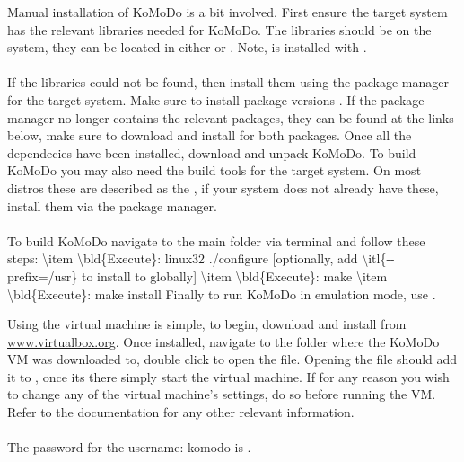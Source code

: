 Manual installation of KoMoDo is a bit involved. First ensure the target system has the relevant libraries needed for KoMoDo. The libraries
should be on the system, they can be located in either  or . Note,  is installed with .\\\\
%
If the libraries could not be found, then install them using the package manager for the target system. Make sure to install package versions . If the package manager no longer contains the relevant packages, they can be found at the links below, make sure to download and install  for both packages.
%
Once all the dependecies have been installed, download and unpack KoMoDo. To build KoMoDo you may also need the build tools for the target system. On most distros these are described as the , if your system does not already have these, install them via the package manager.\\\\
%
To build KoMoDo navigate to the main folder via terminal and follow these steps:
\num{
  \item \bld{Execute}: linux32 ./configure [optionally, add \itl{--prefix=/usr} to install to globally]
  \item \bld{Execute}: make
  \item \bld{Execute}: make install
}
%
Finally to run KoMoDo in emulation mode, use .

Using the virtual machine is simple, to begin, download and install  from \textcolor{blue}{\url{www.virtualbox.org}}. Once installed, navigate to the folder where the KoMoDo VM was downloaded to, double click to open the  file. Opening the file should add it to , once its there simply start the virtual machine. If for any reason you wish to change any of the virtual machine's settings, do so before running the VM. Refer to the  documentation for any other relevant information.\\\\
%
The password for the username: komodo is .
